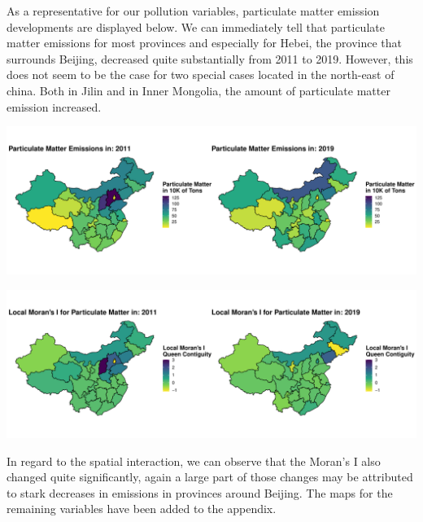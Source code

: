 \documentclass[
]{article}
\begin{document}
	As a representative for our pollution variables, particulate matter emission developments are displayed below. We can immediately tell that particulate matter emissions for most provinces and especially for Hebei, the province that surrounds Beijing, decreased quite substantially from 2011 to 2019. However, this does not seem to be the case for two special cases located in the north-east of china. Both in Jilin and in Inner Mongolia, the amount of particulate matter emission increased.
	\begin{center}
		\includegraphics[width = 440pt]{Waste_Gas_Emissions_Particular_Matter_comp.pdf} 
	\end{center}
	\begin{center}
		\includegraphics[width = 440pt]{Ii_Waste_Gas_Emissions_Particular_Matter_comp.pdf} 
	\end{center}
	In regard to the spatial interaction, we can observe that the Moran's I also changed quite significantly, again a large part of those changes may be attributed to stark decreases in emissions in provinces around Beijing. The maps for the remaining variables have been added to the appendix.
\end{document}
